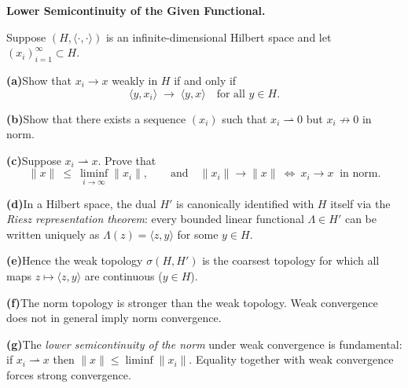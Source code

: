 \begin{problem}[CP-II-0457]
\label{prob:cp-ii-0457}
\textbf{Lower Semicontinuity of the Given Functional.}

\hspace*{1.5em}Suppose $(H,\langle\cdot,\cdot\rangle)$ is an infinite-dimensional Hilbert space and
	let $(x_i)_{i=1}^\infty\subset H$.

		\par\smallskip\noindent\textbf{(a)}\quad Show that $x_i\to x$ weakly in $H$ if and only if
		\[
		\langle y,x_i\rangle \;\longrightarrow\; \langle y,x\rangle
		\quad\text{for all } y\in H .
		\]
		\par\smallskip\noindent\textbf{(b)}\quad Show that there exists a sequence $(x_i)$ such that
		$x_i\rightharpoonup0$ but $x_i\nrightarrow0$ in norm.
		\par\smallskip\noindent\textbf{(c)}\quad Suppose $x_i\rightharpoonup x$.  Prove that
		\[
		\|x\|\ \le\ \liminf_{i\to\infty}\|x_i\|,
		\qquad
		\text{and}\quad
		\|x_i\|\to\|x\|\ \Longleftrightarrow\ x_i\to x\ \text{ in norm.}
		\]

		\par\smallskip\noindent\textbf{(d)}\quad In a Hilbert space, the dual $H'$ is canonically identified with $H$ itself
		via the \emph{Riesz representation theorem}:
		every bounded linear functional $\Lambda\in H'$ can be written uniquely as
		$\Lambda(z)=\langle z,y\rangle$ for some $y\in H$.
		\par\smallskip\noindent\textbf{(e)}\quad Hence the weak topology $\sigma(H,H')$ is the coarsest topology for which
		all maps $z\mapsto\langle z,y\rangle$ are continuous ($y\in H$).
		\par\smallskip\noindent\textbf{(f)}\quad The norm topology is stronger than the weak topology.
		Weak convergence does not in general imply norm convergence.
		\par\smallskip\noindent\textbf{(g)}\quad The \emph{lower semicontinuity of the norm} under weak convergence is fundamental:
		if $x_i\rightharpoonup x$ then $\|x\|\le\liminf\|x_i\|$.
		Equality together with weak convergence forces strong convergence.
\end{problem}

